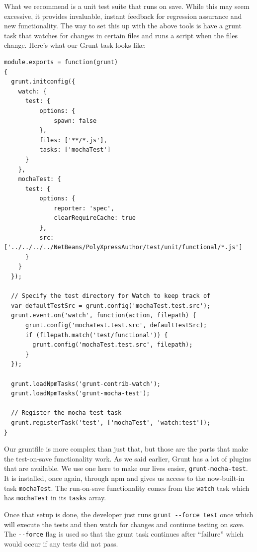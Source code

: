 \documentclass[12pt]{ucthesis}
\begin{document}
What we recommend is a unit test suite that runs on save. While this may seem excessive, it provides invaluable, instant feedback for regression assurance and new functionality. The way to set this up with the above tools is have a grunt task that watches for changes in certain files and runs a script when the files change. Here's what our Grunt task looks like:
\begin{lstlisting}
module.exports = function(grunt)
{
  grunt.initconfig({
    watch: {
      test: {
          options: {
              spawn: false
          },
          files: ['**/*.js'],
          tasks: ['mochaTest']
      }
    },
    mochaTest: {
      test: {
          options: {
              reporter: 'spec',
              clearRequireCache: true
          },
          src: ['../../../../NetBeans/PolyXpressAuthor/test/unit/functional/*.js']
      }
    }
  });

  // Specify the test directory for Watch to keep track of
  var defaultTestSrc = grunt.config('mochaTest.test.src');
  grunt.event.on('watch', function(action, filepath) {
      grunt.config('mochaTest.test.src', defaultTestSrc);
      if (filepath.match('test/functional')) {
        grunt.config('mochaTest.test.src', filepath);
      }
  });

  grunt.loadNpmTasks('grunt-contrib-watch');
  grunt.loadNpmTasks('grunt-mocha-test');

  // Register the mocha test task
  grunt.registerTask('test', ['mochaTest', 'watch:test']);
}
\end{lstlisting}

Our gruntfile is more complex than just that, but those are the parts that make the test-on-save functionality work. As we said earlier, Grunt has a lot of plugins that are available. We use one here to make our lives easier, \lstinline{grunt-mocha-test}. It is installed, once again, through npm and gives us access to the now-built-in task \lstinline{mochaTest}. The run-on-save functionality comes from the \lstinline{watch} task which has \lstinline{mochaTest} in its \lstinline{tasks} array.

Once that setup is done, the developer just runs \lstinline{grunt --force test} once which will execute the tests and then watch for changes and continue testing on save. The \lstinline{--force} flag is used so that the grunt task continues after ``failure'' which would occur if any tests did not pass.
\end{document}
